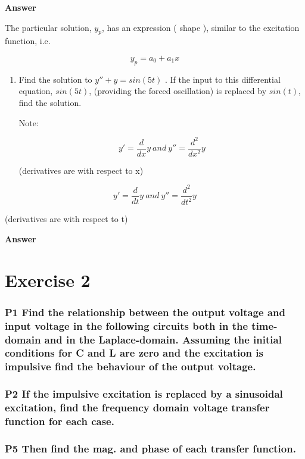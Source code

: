 \documentclass[
]{article}
\begin{document}
\textbf{Answer}

The particular solution, \(y_p\), has an expression ( shape ), similar
to the excitation function, i.e.

\[y_p =a_0 + a_1x\]

\begin{enumerate}
\def\labelenumi{\arabic{enumi}.}
\item
  Find the solution to \(y'' + y = sin(5t)\) . If the input to this
  differential equation, \(sin(5t)\), (providing the forced oscillation)
  is replaced by \(sin(t)\), find the solution.

  Note:

  \[y' = \frac{d}{dx}y \ and \ y'' = \frac{d^2}{dx^2}y\]

  (derivatives are with respect to x)
\end{enumerate}

\[y' =\frac{d}{dt}y\ and\ y''=\frac{d^2}{dt^2}y\]

(derivatives are with respect to t)

\textbf{Answer}

\hypertarget{header-n148}{%
\section{Exercise 2}\label{header-n148}}

\hypertarget{header-n149}{%
\subsubsection{P1 Find the relationship between the output voltage and
input voltage in the following circuits both in the time-domain and in
the Laplace-domain. Assuming the initial conditions for C and L are zero
and the excitation is impulsive find the behaviour of the output
voltage.}\label{header-n149}}

\hypertarget{header-n150}{%
\subsubsection{P2 If the impulsive excitation is replaced by a
sinusoidal excitation, find the frequency domain voltage transfer
function for each case.}\label{header-n150}}

\hypertarget{header-n151}{%
\subsubsection{P5 Then find the mag. and phase of each transfer
function.}\label{header-n151}}
\end{document}
